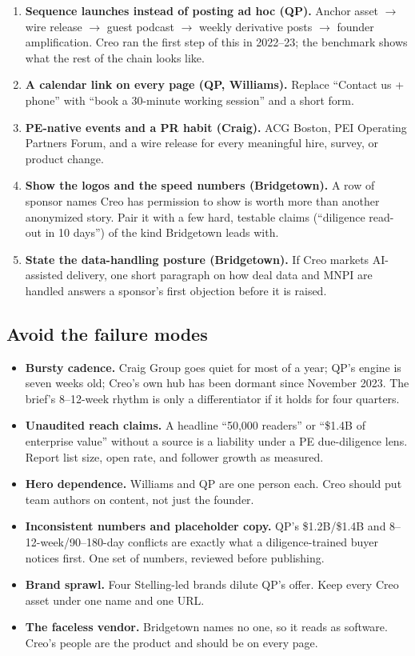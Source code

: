 \documentclass[11pt]{article}
\begin{document}
\begin{enumerate}
  \item \textbf{Sequence launches instead of posting ad hoc (QP).} Anchor asset
  $\rightarrow$ wire release $\rightarrow$ guest podcast $\rightarrow$ weekly derivative
  posts $\rightarrow$ founder amplification. Creo ran the first step of this in 2022--23;
  the benchmark shows what the rest of the chain looks like.
  \item \textbf{A calendar link on every page (QP, Williams).} Replace ``Contact us +
  phone'' with ``book a 30-minute working session'' and a short form.
  \item \textbf{PE-native events and a PR habit (Craig).} ACG Boston, PEI Operating
  Partners Forum, and a wire release for every meaningful hire, survey, or product
  change.
  \item \textbf{Show the logos and the speed numbers (Bridgetown).} A row of
  sponsor names Creo has permission to show is worth more than another anonymized
  story. Pair it with a few hard, testable claims (``diligence read-out in 10 days'')
  of the kind Bridgetown leads with.
  \item \textbf{State the data-handling posture (Bridgetown).} If Creo markets
  AI-assisted delivery, one short paragraph on how deal data and MNPI are handled
  answers a sponsor's first objection before it is raised.
\end{enumerate}

\subsection{Avoid the failure modes}
\begin{itemize}
  \item \textbf{Bursty cadence.} Craig Group goes quiet for most of a year; QP's engine
  is seven weeks old; Creo's own hub has been dormant since November 2023. The brief's
  8--12-week rhythm is only a differentiator if it holds for four quarters.
  \item \textbf{Unaudited reach claims.} A headline ``50,000 readers'' or ``\$1.4B of
  enterprise value'' without a source is a liability under a PE due-diligence lens.
  Report list size, open rate, and follower growth as measured.
  \item \textbf{Hero dependence.} Williams and QP are one person each. Creo should put
  team authors on content, not just the founder.
  \item \textbf{Inconsistent numbers and placeholder copy.} QP's \$1.2B/\$1.4B and
  8--12-week/90--180-day conflicts are exactly what a diligence-trained buyer notices
  first. One set of numbers, reviewed before publishing.
  \item \textbf{Brand sprawl.} Four Stelling-led brands dilute QP's offer. Keep every
  Creo asset under one name and one URL.
  \item \textbf{The faceless vendor.} Bridgetown names no one, so it reads as
  software. Creo's people are the product and should be on every page.
\end{itemize}
\end{document}
